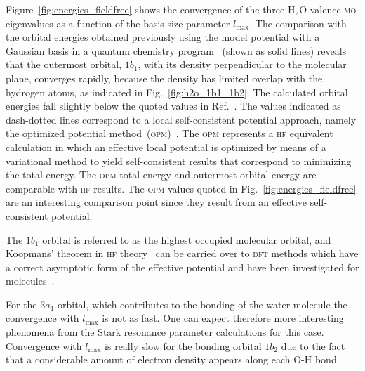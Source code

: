 Figure~\ref{fig:energies_fieldfree} shows the convergence of the three
H$_{2}$O valence \textsc{mo} eigenvalues as a function of the basis
size parameter $l_{\mathrm{max}}$. The comparison with the orbital
energies obtained previously using the model potential with a Gaussian
basis in a quantum chemistry program~\cite{illescas_2015} (shown as
solid lines) reveals that the outermost orbital, $1b_{1}$, with its
density perpendicular to the molecular plane, converges rapidly,
because the density has limited overlap with the hydrogen atoms, as
indicated in Fig.~\ref{fig:h2o_1b1_1b2}. The calculated orbital
energies fall slightly below the quoted values in
Ref.~\cite{illescas_2015}. The values indicated as dash-dotted lines
correspond to a local self-consistent potential approach, namely the
optimized potential method~(\textsc{opm})~\cite{opm_2007}. The
\textsc{opm} represents a \textsc{hf} equivalent calculation in which
an effective local potential is optimized by means of a variational
method to yield self-consistent results that correspond to minimizing
the total energy. The \textsc{opm} total energy and outermost orbital
energy are comparable with \textsc{hf} results. The \textsc{opm}
values quoted in Fig.~\ref{fig:energies_fieldfree} are an interesting
comparison point since they result from an effective self-consistent
potential.

The $1b_{1}$ orbital is referred to as the highest occupied molecular
orbital, and Koopmans' theorem in \textsc{hf}
theory~\cite{Koopman_th_2018} can be carried over to \textsc{dft}
methods which have a correct asymptotic form of the effective
potential and have been investigated for
molecules~\cite{HF_molecules_2010}.

For the $3a_{1}$ orbital, which contributes to the bonding of the
water molecule the convergence with $l_{\mathrm{max}}$ is not as
fast. One can expect therefore more interesting phenomena from the
Stark resonance parameter calculations for this case. Convergence with
$l_{\mathrm{max}}$ is really slow for the bonding orbital $1b_{2}$ due
to the fact that a considerable amount of electron density appears
along each O-H bond.

